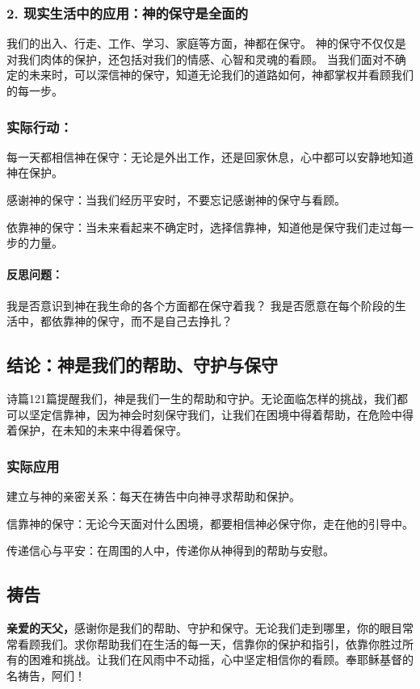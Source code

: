 \documentclass[a4paper, 12pt]{article}
\begin{document}
\subsubsection*{2. 现实生活中的应用：神的保守是全面的}
我们的出入、行走、工作、学习、家庭等方面，神都在保守。
神的保守不仅仅是对我们肉体的保护，还包括对我们的情感、心智和灵魂的看顾。
当我们面对不确定的未来时，可以深信神的保守，知道无论我们的道路如何，神都掌权并看顾我们的每一步。
\subsubsection*{实际行动：}

\hspace{0.6cm}每一天都相信神在保守：无论是外出工作，还是回家休息，心中都可以安静地知道神在保护。

感谢神的保守：当我们经历平安时，不要忘记感谢神的保守与看顾。

依靠神的保守：当未来看起来不确定时，选择信靠神，知道他是保守我们走过每一步的力量。
\paragraph*{反思问题：}

我是否意识到神在我生命的各个方面都在保守着我？
我是否愿意在每个阶段的生活中，都依靠神的保守，而不是自己去挣扎？
\subsection*{结论：神是我们的帮助、守护与保守}
诗篇121篇提醒我们，神是我们一生的帮助和守护。无论面临怎样的挑战，我们都可以坚定信靠神，因为神会时刻保守我们，让我们在困境中得着帮助，在危险中得着保护，在未知的未来中得着保守。

\subsubsection*{实际应用}
\hspace{0.6cm}建立与神的亲密关系：每天在祷告中向神寻求帮助和保护。

信靠神的保守：无论今天面对什么困境，都要相信神必保守你，走在他的引导中。

传递信心与平安：在周围的人中，传递你从神得到的帮助与安慰。

\subsection*{祷告}
\textbf{亲爱的天父，}感谢你是我们的帮助、守护和保守。无论我们走到哪里，你的眼目常常看顾我们。求你帮助我们在生活的每一天，信靠你的保护和指引，依靠你胜过所有的困难和挑战。让我们在风雨中不动摇，心中坚定相信你的看顾。奉耶稣基督的名祷告，阿们！
\newpage
\end{document}
